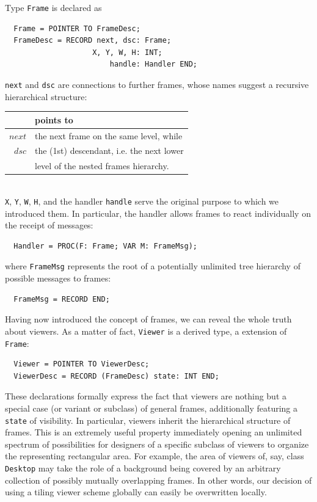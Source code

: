 Type \verb|Frame| is declared as
\begin{verbatim}
  Frame = POINTER TO FrameDesc;
  FrameDesc = RECORD next, dsc: Frame;
                    X, Y, W, H: INT;
                        handle: Handler END;
\end{verbatim}
\verb|next| and \verb|dsc| are connections to further frames,
whose names suggest a recursive hierarchical structure:
\begin{table}[h!]
  \centering
  \begin{tabular}{r l}
           & points to \\\hline
    $next$ & the next frame on the same level, while \\
    $dsc$  & the (1st) descendant, i.e. the next lower \\
           & level of the nested frames hierarchy.
  \end{tabular}
\end{table}
\\\verb|X|, \verb|Y|, \verb|W|, \verb|H|, and the handler \verb|handle| serve the original purpose
to which we introduced them. In particular, the handler allows frames to react individually
on the receipt of messages:
\begin{verbatim}
  Handler = PROC(F: Frame; VAR M: FrameMsg);
\end{verbatim}
where \verb|FrameMsg| represents the root of a potentially unlimited tree hierarchy
of possible messages to frames:
\begin{verbatim}
  FrameMsg = RECORD END;
\end{verbatim}
Having now introduced the concept of frames, we can reveal the whole truth about viewers.
As a matter of fact, \verb|Viewer| is a derived type, a extension of \verb|Frame|:
\begin{verbatim}
  Viewer = POINTER TO ViewerDesc;
  ViewerDesc = RECORD (FrameDesc) state: INT END;
\end{verbatim}
These declarations formally express the fact that viewers are nothing but a special case
(or variant or subclass) of general frames, additionally featuring a \verb|state| of visibility.
In particular, viewers inherit the hierarchical structure of frames.  This is
an extremely useful property immediately opening an unlimited spectrum of possibilities
for designers of a specific subclass of viewers to organize the representing rectangular area.
For example, the area of viewers of, say, class \verb|Desktop| may take the role of a background
being covered by an arbitrary collection of possibly mutually overlapping frames. In other words,
our decision of using a tiling viewer scheme globally can easily be overwritten locally.

